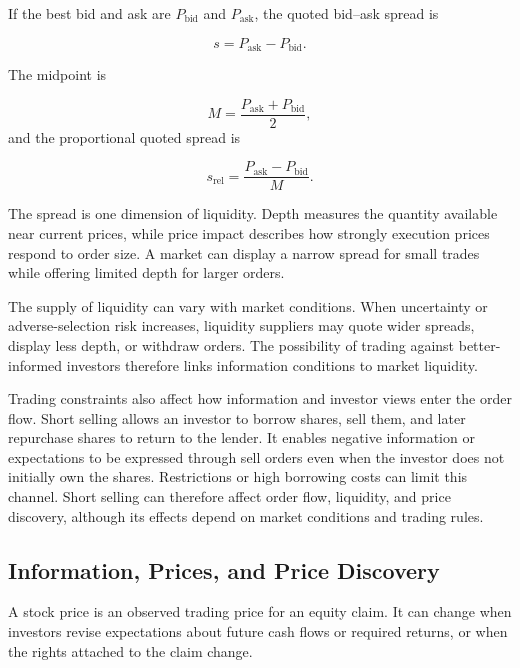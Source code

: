 If the best bid and ask are \(P_{\mathrm{bid}}\) and \(P_{\mathrm{ask}}\), the quoted bid--ask spread is

\begin{equation*}
s=P_{\mathrm{ask}}-P_{\mathrm{bid}}.
\label{eq:ch9-bid-ask-spread}
\end{equation*}

The midpoint is

\begin{equation*}
M=\frac{P_{\mathrm{ask}}+P_{\mathrm{bid}}}{2},
\label{eq:ch9-midquote}
\end{equation*}
and the proportional quoted spread is

\begin{equation*}
s_{\mathrm{rel}}
=
\frac{P_{\mathrm{ask}}-P_{\mathrm{bid}}}{M}.
\label{eq:ch9-relative-spread}
\end{equation*}

The spread is one dimension of liquidity. Depth measures the quantity available near current prices, while price impact describes how strongly execution prices respond to order size. A market can display a narrow spread for small trades while offering limited depth for larger orders.

The supply of liquidity can vary with market conditions. When uncertainty or adverse-selection risk increases, liquidity suppliers may quote wider spreads, display less depth, or withdraw orders. The possibility of trading against better-informed investors therefore links information conditions to market liquidity.

Trading constraints also affect how information and investor views enter the order flow. Short selling allows an investor to borrow shares, sell them, and later repurchase shares to return to the lender. It enables negative information or expectations to be expressed through sell orders even when the investor does not initially own the shares. Restrictions or high borrowing costs can limit this channel. Short selling can therefore affect order flow, liquidity, and price discovery, although its effects depend on market conditions and trading rules.

\subsection{Information, Prices, and Price Discovery}

A stock price is an observed trading price for an equity claim. It can change when investors revise expectations about future cash flows or required returns, or when the rights attached to the claim change.

